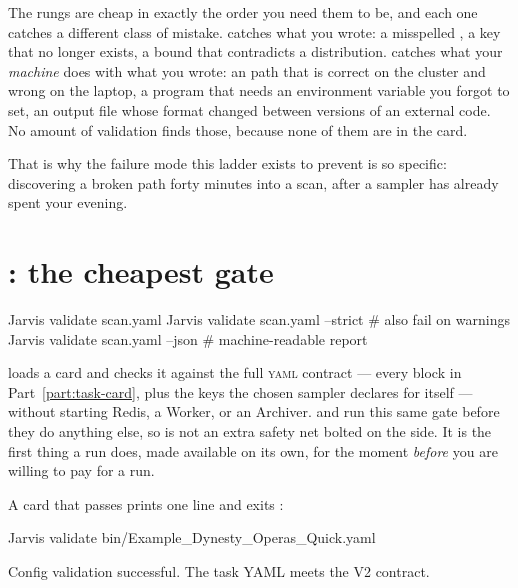 The rungs are cheap in exactly the order you need them to be, and each one catches a
different class of mistake.  catches what you wrote: a misspelled
, a key that no longer exists, a bound that contradicts a
distribution.  catches what your \emph{machine} does with what you wrote: an
 path that is correct on the cluster and wrong on the laptop, a program
that needs an environment variable you forgot to set, an output file whose format
changed between versions of an external code. No amount of validation finds those,
because none of them are in the card.

That is why the failure mode this ladder exists to prevent is so specific: discovering a
broken path forty minutes into a scan, after a sampler has already spent your evening.

\section{: the cheapest gate}
\label{sec:cli-validate}

\begin{terminal}
\begin{jcmd}
Jarvis validate scan.yaml
Jarvis validate scan.yaml --strict   # also fail on warnings
Jarvis validate scan.yaml --json     # machine-readable report
\end{jcmd}
\end{terminal}

 loads a card and checks it against the full \textsc{yaml} contract ---
every block in Part~\ref{part:task-card}, plus the keys the chosen sampler declares for
itself --- without starting Redis, a Worker, or an Archiver.  and
 run this same gate before they do anything else, so 
is not an extra safety net bolted on the side. It is the first thing a run does, made
available on its own, for the moment \emph{before} you are willing to pay for a run.

A card that passes prints one line and exits :

\begin{terminal}
\begin{jcmd}
Jarvis validate bin/Example_Dynesty_Operas_Quick.yaml
\end{jcmd}
\termsep
\begin{jout}
Config validation successful. The task YAML meets the V2 contract.
\end{jout}
\end{terminal}

